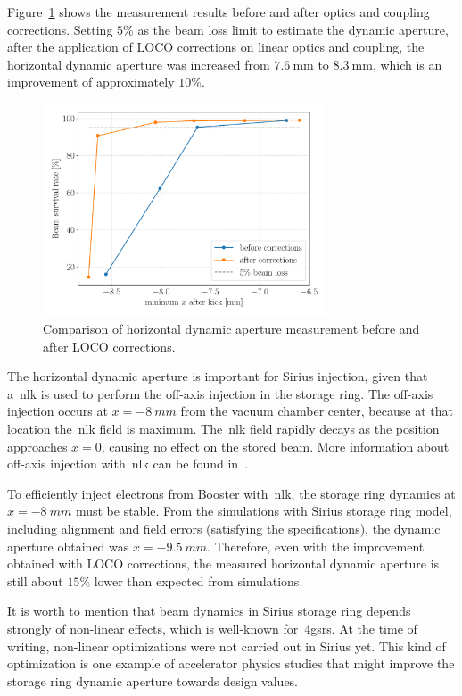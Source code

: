 Figure~\ref{fig:xdynap} shows the measurement results before and after optics and coupling corrections. Setting $5\%$ as the beam loss limit to estimate the dynamic aperture, after the application of LOCO corrections on linear optics and coupling, the horizontal dynamic aperture was increased from $\SI{7.6}{\milli\meter}$ to $\SI{8.3}{\milli\meter}$, which is an improvement of approximately $10\%$.
\begin{figure}
\centering
\includegraphics[width=0.75\textwidth]{figures/xdynamic_aperture_grid.pdf}
\caption{Comparison of horizontal dynamic aperture measurement before and after LOCO corrections.}
\label{fig:xdynap}
\end{figure}

The horizontal dynamic aperture is important for Sirius injection, given that a~\gls{nlk} is used to perform the off-axis injection in the storage ring. The off-axis injection occurs at $x=\SI{-8}{mm}$ from the vacuum chamber center, because at that location the~\gls{nlk} field is maximum. The~\gls{nlk} field rapidly decays as the position approaches $x=0$, causing no effect on the stored beam. More information about off-axis injection with~\gls{nlk} can be found in~\cite{liu2016a, wikinlk}.

To efficiently inject electrons from Booster with~\gls{nlk}, the storage ring dynamics at $x=\SI{-8}{mm}$ must be stable. From the simulations with Sirius storage ring model, including alignment and field errors (satisfying the specifications), the dynamic aperture obtained was $x=\SI{-9.5}{mm}$. Therefore, even with the improvement obtained with LOCO corrections, the measured horizontal dynamic aperture is still about $15\%$ lower than expected from simulations. 

It is worth to mention that beam dynamics in Sirius storage ring depends strongly of non-linear effects, which is well-known for~\glspl{4gsr}. At the time of writing, non-linear optimizations were not carried out in Sirius yet. This kind of optimization is one example of accelerator physics studies that might improve the storage ring dynamic aperture towards design values.

